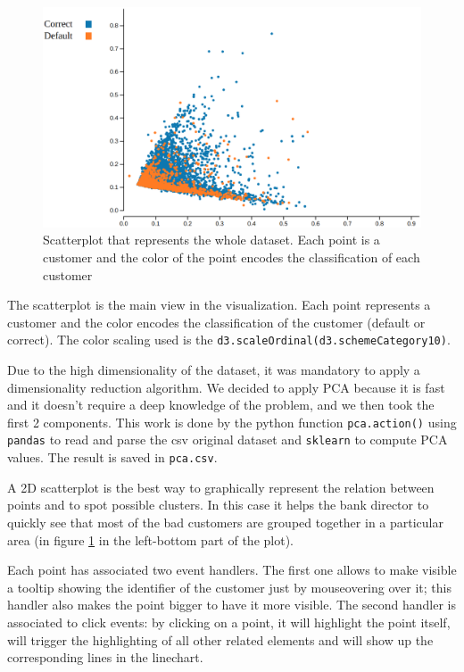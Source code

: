 \documentclass[journal]{vgtc}                %
\begin{document}
\begin{figure}[h]
  \includegraphics[scale=0.15]{scatterplot}
  \caption{Scatterplot that represents the whole dataset. Each point is a customer and the color of the point encodes the classification of each customer}
  \label{scatterplot}
\end{figure}
The scatterplot is the main view in the visualization. Each point represents a customer and the color encodes the classification of the customer (default or correct). The color scaling used is the \texttt{d3.scaleOrdinal(d3.schemeCategory10)}\cite{d3:2018}.

Due to the high dimensionality of the dataset, it was mandatory to apply a dimensionality reduction algorithm. We decided to apply PCA \cite{sklearn:2018} because it is fast and it doesn't require a deep knowledge of the problem, and we then took the first 2 components. This work is done by the python function \texttt{pca.action()} using \texttt{pandas} \cite{pandas:2018} to read and parse the csv original dataset
and \texttt{sklearn} to compute PCA values. The result is saved in \texttt{pca.csv}.

A 2D scatterplot is the best way to graphically represent the relation between points and to spot possible clusters. In this case it helps the bank director to quickly see that most of the bad customers are grouped together in a particular area (in figure \ref{scatterplot} in the left-bottom part of the plot).

Each point has associated two event handlers. The first one allows to make visible a tooltip showing the identifier of the customer just by mouseovering over it; this handler also makes the point bigger to have it more visible.
The second handler is associated to click events: by clicking on a point, it will highlight the point itself, will trigger the highlighting of all other related elements and will show up the corresponding lines in the linechart.
\end{document}
